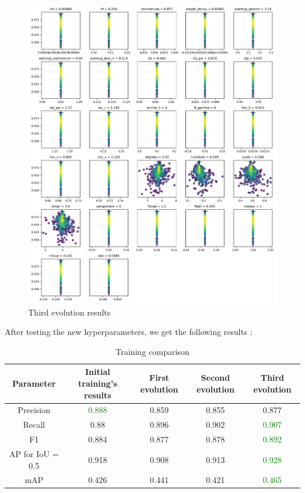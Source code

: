 \documentclass{article}
\begin{document}
\newpage

\begin{figure}[!ht]
  \centering
  \includegraphics[scale=0.6]{evolution/evolve.png}
  \caption{Third evolution results}
  \label{Figure 22}
\end{figure}

\newpage

After testing the new hyperparameters, we get the following results :

\begin{table}[h!]
\centering
\begin{tabular}{|c|c|c|c|c|} 
 \hline
 Parameter & Initial training's results & First evolution & Second evolution & Third evolution\\ [0.5ex] 
 \hline\hline
 Precision & \textcolor{green}{0.888} & 0.859 & 0.855 & 0.877 \\ 
 Recall & 0.88& 0.896& 0.902 & \textcolor{green}{0.907} \\
 F1 & 0.884 & 0.877 & 0.878 & \textcolor{green}{0.892} \\
 AP for IoU = 0.5 & 0.918 & 0.908 & 0.913 & \textcolor{green}{0.928} \\
 mAP & 0.426 & 0.441 & 0.421 & \textcolor{green}{0.465} \\ [1ex] 
 \hline
\end{tabular}
\caption{Training comparison}
\label{Table 7}
\end{table}
\end{document}
